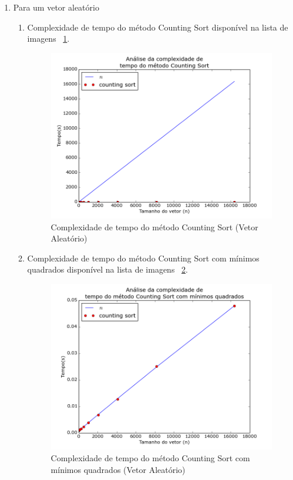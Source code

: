 \documentclass[12pt,a4paper,twoside]{report}
\begin{document}
\begin{enumerate}

	\item Para um vetor aleatório
	\begin{enumerate}
		\item Complexidade de tempo do método Counting Sort disponível na lista de imagens ~\ref{fig:CountingPlot2A}.
		\begin{figure}[!h]
			\centering
			\includegraphics[scale=0.6]{../imagens/Counting/counting_plot_2_aleatorio.png}
			\caption{Complexidade de tempo do método Counting Sort (Vetor Aleatório)\label{fig:CountingPlot2A}}
		\end{figure}


		\item Complexidade de tempo do método Counting Sort com mínimos quadrados disponível na lista de imagens ~\ref{fig:CountingPlot3A}.
		\begin{figure}[!h]
			\centering
			\includegraphics[scale=0.6]{../imagens/Counting/counting_plot_3_aleatorio.png}
			\caption{Complexidade de tempo do método Counting Sort com mínimos quadrados (Vetor Aleatório) \label{fig:CountingPlot3A}}
		\end{figure}


\end{enumerate}
\end{enumerate}
\end{document}
